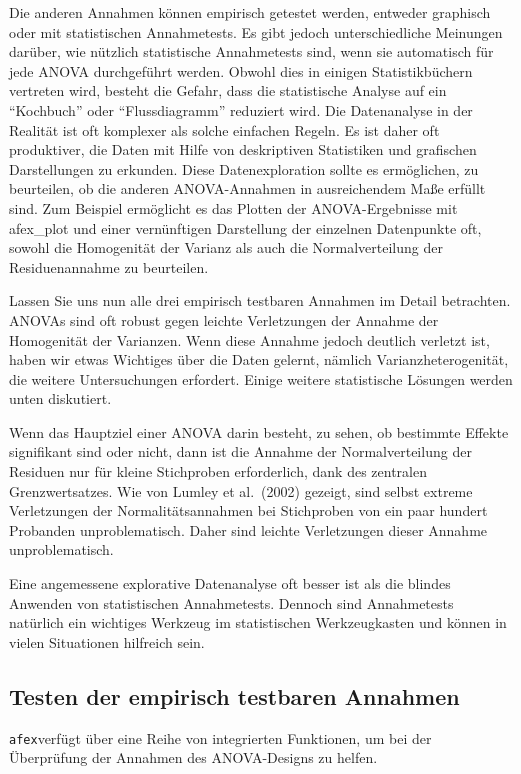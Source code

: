 \documentclass[
]{book}
\begin{document}
Die anderen Annahmen können empirisch getestet werden, entweder graphisch oder mit statistischen Annahmetests. Es gibt jedoch unterschiedliche Meinungen darüber, wie nützlich statistische Annahmetests sind, wenn sie automatisch für jede ANOVA durchgeführt werden. Obwohl dies in einigen Statistikbüchern vertreten wird, besteht die Gefahr, dass die statistische Analyse auf ein ``Kochbuch'' oder ``Flussdiagramm'' reduziert wird. Die Datenanalyse in der Realität ist oft komplexer als solche einfachen Regeln. Es ist daher oft produktiver, die Daten mit Hilfe von deskriptiven Statistiken und grafischen Darstellungen zu erkunden. Diese Datenexploration sollte es ermöglichen, zu beurteilen, ob die anderen ANOVA-Annahmen in ausreichendem Maße erfüllt sind. Zum Beispiel ermöglicht es das Plotten der ANOVA-Ergebnisse mit afex\_plot und einer vernünftigen Darstellung der einzelnen Datenpunkte oft, sowohl die Homogenität der Varianz als auch die Normalverteilung der Residuenannahme zu beurteilen.

Lassen Sie uns nun alle drei empirisch testbaren Annahmen im Detail betrachten. ANOVAs sind oft robust gegen leichte Verletzungen der Annahme der Homogenität der Varianzen. Wenn diese Annahme jedoch deutlich verletzt ist, haben wir etwas Wichtiges über die Daten gelernt, nämlich Varianzheterogenität, die weitere Untersuchungen erfordert. Einige weitere statistische Lösungen werden unten diskutiert.

Wenn das Hauptziel einer ANOVA darin besteht, zu sehen, ob bestimmte Effekte signifikant sind oder nicht, dann ist die Annahme der Normalverteilung der Residuen nur für kleine Stichproben erforderlich, dank des zentralen Grenzwertsatzes. Wie von Lumley et al.~(2002) gezeigt, sind selbst extreme Verletzungen der Normalitätsannahmen bei Stichproben von ein paar hundert Probanden unproblematisch. Daher sind leichte Verletzungen dieser Annahme unproblematisch.

Eine angemessene explorative Datenanalyse oft besser ist als die blindes Anwenden von statistischen Annahmetests. Dennoch sind Annahmetests natürlich ein wichtiges Werkzeug im statistischen Werkzeugkasten und können in vielen Situationen hilfreich sein.

\subsection{Testen der empirisch testbaren Annahmen}\label{testen-der-empirisch-testbaren-annahmen}

\texttt{afex}verfügt über eine Reihe von integrierten Funktionen, um bei der Überprüfung der Annahmen des ANOVA-Designs zu helfen.
\end{document}
